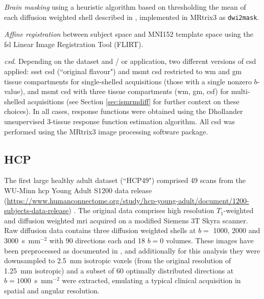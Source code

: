 \textit{Brain masking}\autocite{Tournier2019}
using a heuristic algorithm based on thresholding the mean of each diffusion weighted shell described in \textcite{Dhollander2016}, implemented in MRtrix3\autocite{Tournier2019} as \verb|dwi2mask|.

\textit{Affine registration} between subject space and MNI152\autocite{Fonov2011} template space using the \gls{fsl} Linear Image Registration Tool (FLIRT)\autocite{Jenkinson2001,Jenkinson2002}.

\textit{\Gls{csd}}. Depending on the dataset and / or application, two different versions of \gls{csd} applied: \gls{ssst} \gls{csd}\autocite{Tournier2007,Tournier2019} (``original flavour") and \gls{msmt} \gls{csd}\autocite{Jeurissen2014} restricted to \gls{wm} and \gls{gm} tissue compartments for single-shelled acquisitions (those with a single nonzero $b$-value),
and \gls{msmt} \gls{csd} with three tissue compartments (\gls{wm}, \gls{gm}, \gls{csf}) for multi-shelled acquisitions (see Section \ref{sec:ismrmdiff} for further context on these choices).
In all cases, response functions were obtained using the Dhollander unsupervised 3-tissue response function estimation algorithm\autocite{Dhollander2016,Dhollander2019}.
All \gls{csd} was performed using the MRtrix3 image processing software package\autocite{Tournier2019}.

\subsection{HCP}

The first large healthy adult dataset (``HCP49") comprised 49 scans from the WU-Minn \gls{hcp} Young Adult S1200 data release (\url{https://www.humanconnectome.org/study/hcp-young-adult/document/1200-subjects-data-release}) \autocite{VanEssen2013}.
The original data comprises high resolution $T_1$-weighted and diffusion weighted \gls{mri} acquired on a modified Siemens 3T Skyra scanner.
Raw diffusion data contains three diffusion weighted shells at $b=$ 1000, 2000 and 3000~s~mm$^{-2}$ with 90 directions each and 18 $b=0$ volumes\autocite{Sotiropoulos2013}.
These images have been preprocessed as documented in \textcite{Glasser2013,Sotiropoulos2013},
and additionally for this analysis they were downsampled to 2.5~mm isotropic voxels (from the original resolution of 1.25~mm isotropic) and a subset of 60 optimally distributed directions at $b=1000$~s~mm$^{-2}$ were extracted, emulating a typical clinical acquisition in spatial and angular resolution.

